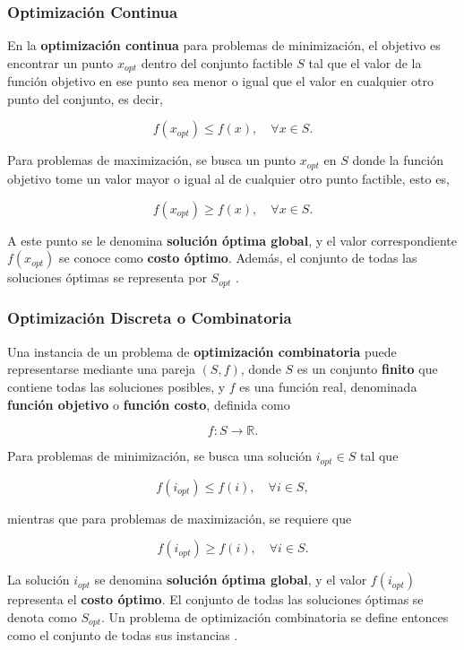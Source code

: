 \documentclass[12pt,titlepage,twoside,openright]{book}
\begin{document}
\subsubsection{Optimización Continua}

En la \textbf{optimización continua} para problemas de minimización, el objetivo es encontrar un punto \( x_{opt} \) dentro del conjunto factible \( S \) tal que el valor de la función objetivo en ese punto sea menor o igual que el valor en cualquier otro punto del conjunto, es decir,

\[
	f(x_{opt}) \leq f(x), \quad \forall x \in S.
\]

Para problemas de maximización, se busca un punto \( x_{opt} \) en \( S \) donde la función objetivo tome un valor mayor o igual al de cualquier otro punto factible, esto es,

\[
	f(x_{opt}) \geq f(x), \quad \forall x \in S.
\]

A este punto se le denomina \textbf{solución óptima global}, y el valor correspondiente \( f(x_{opt}) \) se conoce como \textbf{costo óptimo}. Además, el conjunto de todas las soluciones óptimas se representa por \( S_{opt} \) \citep{cobos2010}.


\subsubsection{Optimización Discreta o Combinatoria}
\label{subsec:opt_discreta}

Una instancia de un problema de \textbf{optimización combinatoria} puede representarse mediante una pareja \((S, f)\), donde \(S\) es un conjunto \textbf{finito} que contiene todas las soluciones posibles, y \(f\) es una función real, denominada \textbf{función objetivo} o \textbf{función costo}, definida como

\[
	f: S \to \mathbb{R}.
\]

Para problemas de minimización, se busca una solución \(i_{opt} \in S\) tal que

\[
	f(i_{opt}) \leq f(i), \quad \forall i \in S,
\]

mientras que para problemas de maximización, se requiere que

\[
	f(i_{opt}) \geq f(i), \quad \forall i \in S.
\]

La solución \(i_{opt}\) se denomina \textbf{solución óptima global}, y el valor \(f(i_{opt})\) representa el \textbf{costo óptimo}. El conjunto de todas las soluciones óptimas se denota como \(S_{opt}\). Un problema de optimización combinatoria se define entonces como el conjunto de todas sus instancias \citep{cobos2010}.
\end{document}
